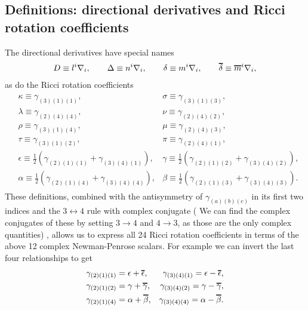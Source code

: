 \documentclass[12pt]{report}
\newcommand*\oline[1]{%
   \vbox{%
     \hrule height 1pt%
     \kern0.25ex%
     \hbox{%
       \ifmmode#1\else\ensuremath{#1}\fi%
     }
   }
}
\begin{document}
\subsection{Definitions:
	directional derivatives and Ricci rotation coefficients}
\label{sec:def_directional_derivatives_Riccci_rotation}
	The directional derivatives have special names
\begin{align}
	D
	\equiv 
	l^i\nabla_i
	, \qquad
	\Delta
	\equiv
	n^i\nabla_i
	, \qquad
	\delta
	\equiv
	m^i\nabla_i
	, \qquad
	\oline{\delta}
	\equiv
	\oline{m}^i\nabla_i
	,
\end{align}
	as do the Ricci rotation coefficients
\begin{align}
\begin{aligned}
\label{eq:def_Ricci_rotation_NP}
	&
	\kappa
	\equiv
	\gamma_{(3)(1)(1)}
	, &
	\sigma
	\equiv
	\gamma_{(3)(1)(3)}
	, \\
	&
	\lambda
	\equiv
	\gamma_{(2)(4)(4)}
	, &
	\nu
	\equiv
	\gamma_{(2)(4)(2)}
	, \\
	&
	\rho
	\equiv
	\gamma_{(3)(1)(4)}
	, &
	\mu
	\equiv
	\gamma_{(2)(4)(3)}
	, \\
	&
	\tau
	\equiv
	\gamma_{(3)(1)(2)}
	, &
	\pi
	\equiv
	\gamma_{(2)(4)(1)}
	, \\
	&
	\epsilon
	\equiv
	\frac{1}{2}\left(
		\gamma_{(2)(1)(1)}
	+	\gamma_{(3)(4)(1)}
	\right)
	, &
	\gamma
	\equiv
	\frac{1}{2}\left(
		\gamma_{(2)(1)(2)}
	+	\gamma_{(3)(4)(2)}
	\right)
	, \\
	&
	\alpha
	\equiv
	\frac{1}{2}\left(
		\gamma_{(2)(1)(4)}
	+	\gamma_{(3)(4)(4)}
	\right)
	, &
	\beta
	\equiv
	\frac{1}{2}\left(
		\gamma_{(2)(1)(3)}
	+	\gamma_{(3)(4)(3)}
	\right)
	.
\end{aligned}
\end{align}
	These definitions, combined with the antisymmetry of
$\gamma_{(a)(b)(c)}$ in its first two indices and the $3\leftrightarrow4$
rule with complex conjugate (
	We can find the complex conjugates of these by 
setting $3\to4$ and $4\to3$, as those are the only complex quantities) 
, allows us to express all 24 Ricci rotation
coefficients in terms of the above 12 complex Newman-Penrose scalars.
For example we can invert the last four relationships to get
\begin{align}
\label{eq:definite_ricci_rot_NP_scalars}
\begin{aligned}
	&
	\gamma_{(2)(1)(1)}
	=
	\epsilon + \oline{\epsilon}
	, &
	\gamma_{(3)(4)(1)}
	=
	\epsilon - \oline{\epsilon}
	, \\
	&
	\gamma_{(2)(1)(2)}
	=
	\gamma + \oline{\gamma}
	, &
	\gamma_{(3)(4)(2)}
	=
	\gamma - \oline{\gamma}
	, \\
	&
	\gamma_{(2)(1)(4)}
	=
	\alpha + \oline{\beta}
	, &
	\gamma_{(3)(4)(4)}
	=
	\alpha - \oline{\beta}
	.
\end{aligned}
\end{align} 
\end{document}

